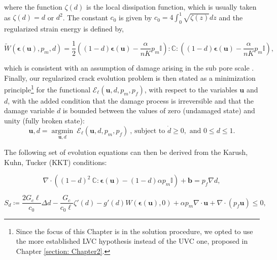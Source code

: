 \noindent where the function $\zeta(d)$ is the local dissipation function, which is usually taken as $\zeta(d) = d$ or $d^2$. The constant $c_0$ is given by $c_0 = 4\int_0^1 \sqrt{\zeta(z)}dz$ and the regularized strain energy is defined by,

\begin{equation}\label{damaged strain energy}
    \widetilde{W}(\boldsymbol{\epsilon}(\textbf{u}), p_m, d) = \dfrac{1}{2}\left( (1-d)\boldsymbol\epsilon(\textbf{u}) - \dfrac{\alpha}{nK} p_m\mathbb{I}\right) : \mathbb{C} : \left( (1-d)\boldsymbol\epsilon(\textbf{u}) - \dfrac{\alpha}{nK} p_m\mathbb{I}\right),
\end{equation}

\noindent which is consistent with an assumption of damage arising in the sub pore scale \cite{chukwudozie2019variational}. Finally, our regularized crack evolution problem is then stated as a minimization principle\footnote{Since the focus of this Chapter is in the solution procedure, we opted to use the more established LVC hypothesis instead of the UVC one, proposed in Chapter \ref{section: Chapter2}.} for the functional $\mathcal{E}_{\ell}(\textbf{u},d,p_m,p_f)$, with respect to the variables $\textbf{u}$ and $d$, with the added condition that the damage process is irreversible and that the damage variable $d$ is bounded between the values of zero (undamaged state) and unity (fully broken state):
\begin{equation}\label{variational formulation of phase-field}
    \textbf{u}, d = \underset{\textbf{u},d}{{\operatorname{argmin}}} \ \mathcal{E}_{\ell}(\textbf{u},d,p_m,p_f)\ \text{,\ \   subject to } \dot{d} \ge 0, \text{ and } 0 \le d \le 1. 
\end{equation}

The following set of evolution equations can then be derived from the Karush, Kuhn, Tucker (KKT) \cite{karush1939minima, kuhn1951nonlinear} conditions:

\begin{equation}\label{basic u problem}
    \nabla \cdot \left( (1-d)^2\ \mathbb{C}:\boldsymbol\epsilon(\textbf{u}) -(1-d)\alpha p_m \mathbb{I}\right) + \textbf{b} = p_f\nabla d, 
\end{equation}

\begin{equation}\label{damage equation ch3}
    S_d \coloneqq  \dfrac{2G_c\ell}{c_0}\Delta d - \dfrac{G_c}{c_0\ell}\zeta'(d)-g'(d)W(\boldsymbol{\epsilon}(\boldsymbol{\textbf{u}}),0) + \alpha p_m\nabla \cdot \textbf{u} + \nabla \cdot (p_f\textbf{u}) \le 0,
\end{equation}

